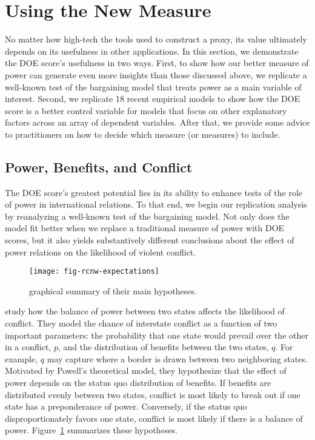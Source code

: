 
\section{Using the New Measure}
\label{sec:replications}

No matter how high-tech the tools used to construct a proxy, its value ultimately depends on its usefulness in other applications.
In this section, we demonstrate the DOE score's usefulness in two ways.
First, to show how our better measure of power can generate even more insights than those discussed above, we replicate a well-known test of the bargaining model that treats power as a main variable of interest.
Second, we replicate 18 recent empirical models to show how the DOE score is a better control variable for models that focus on other explanatory factors across an array of dependent variables.
After that, we provide some advice to practitioners on how to decide which measure (or measures) to include.

\subsection{Power, Benefits, and Conflict}

The DOE score's greatest potential lies in its ability to enhance tests of the role of power in international relations.
To that end, we begin our replication analysis by reanalyzing a well-known test of the bargaining model.
Not only does the model fit better when we replace a traditional measure of power with DOE scores, but it also yields substantively different conclusions about the effect of power relations on the likelihood of violent conflict.

\begin{figure}[tp]
  \centering
  \texttt{[image: fig-rcnw-expectations]}
  \caption{
     graphical summary of their main hypotheses.
  }
  \label{fig:rcnw-expectations}
\end{figure}

\citet{reed2008war} study how the balance of power between two states affects the likelihood of conflict.
They model the chance of interstate conflict as a function of two important parameters: the probability that one state would prevail over the other in a conflict, $p$, and the distribution of benefits between the two states, $q$.
For example, $q$ may capture where a border is drawn between two neighboring states.
Motivated by Powell's \citeyearpar{powell1996stability,powell1999} theoretical model, they hypothesize that the effect of power depends on the status quo distribution of benefits.
If benefits are distributed evenly between two states, conflict is most likely to break out if one state has a preponderance of power.
Conversely, if the status quo disproportionately favors one state, conflict is most likely if there is a balance of power.
Figure~\ref{fig:rcnw-expectations} summarizes these hypotheses.

